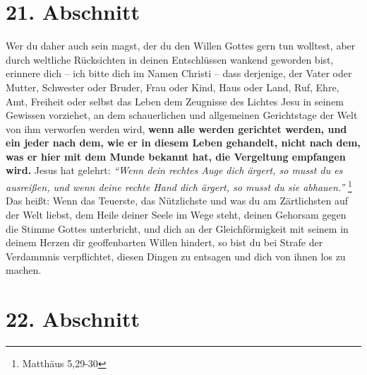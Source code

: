 \section{21. Abschnitt} \label{kap4_ab21}

Wer du daher auch sein magst, der du den Willen Gottes gern tun wolltest, aber
durch weltliche Rücksichten in deinen Entschlüssen wankend geworden bist,
erinnere dich -- ich bitte dich im Namen Christi -- dass derjenige, der Vater oder
Mutter, Schwester oder Bruder, Frau oder Kind, Haus oder Land, Ruf, Ehre, Amt,
Freiheit oder selbst das Leben dem Zeugnisse des Lichtes Jesu  in seinem
Gewissen vorziehet, an dem schauerlichen und allgemeinen Gerichtstage  der Welt
von ihm verworfen werden wird, \textbf{wenn alle werden gerichtet werden, und
ein jeder
nach dem, wie er in diesem Leben gehandelt, nicht nach dem, was er hier mit dem
Munde bekannt  hat, die Vergeltung empfangen wird.} Jesus hat gelehrt:
\textit{"`Wenn
dein rechtes Auge dich ärgert, so musst du es ausreißen, und wenn deine rechte
Hand dich ärgert, so musst du sie abhauen."'}
\footnote{Matthäus  5,29-30}
Das heißt:
Wenn das Teuerste, das Nützlichste und was du am Zärtlichsten auf der Welt
liebst, dem Heile deiner Seele im Wege steht, deinen Gehorsam gegen die Stimme
Gottes unterbricht, und dich an der Gleichförmigkeit mit seinem in deinem Herzen
dir geoffenbarten Willen hindert, so bist du bei Strafe der Verdammnis
verpflichtet, diesen Dingen zu entsagen und dich von ihnen los zu machen.

\section{22. Abschnitt} \label{kap4_ab22}

